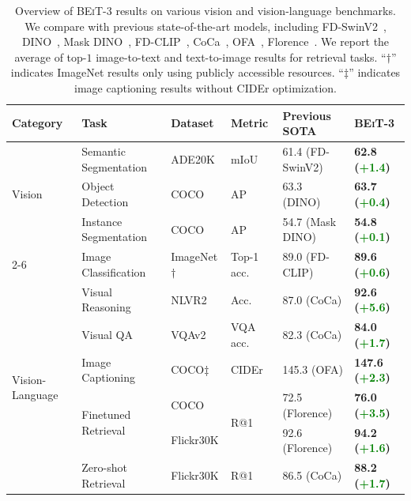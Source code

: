 \documentclass{article}
\newcommand\our{\textsc{BEiT-3}}
\begin{document}
\begin{table}
\centering
\small
\begin{tabular}{@{}llllll@{}}
\toprule
\bf Category & \bf Task & \bf Dataset & \bf Metric & \bf Previous SOTA & \bf \our{} \\
\midrule
\multirow{3}{*}{Vision} & Semantic Segmentation & ADE20K & mIoU & 61.4 (FD-SwinV2) & \bf 62.8 (\textcolor{Green}{+1.4}) \\
\cmidrule{2-6}
& Object Detection & COCO & AP & 63.3 (DINO) & \bf 63.7
(\textcolor{Green}{+0.4}) \\
& Instance Segmentation & COCO & AP & 54.7 (Mask DINO) & \bf 54.8
(\textcolor{Green}{+0.1}) \\
\cmidrule{2-6}
& Image Classification & ImageNet$\dag$ & Top-1 acc. & 89.0 (FD-CLIP) & \bf 89.6 (\textcolor{Green}{+0.6}) \\
\midrule
\multirow{6}{*}{Vision-Language} & Visual Reasoning & NLVR2 & Acc. & 87.0 (CoCa) & \bf 92.6 (\textcolor{Green}{+5.6}) \\
\cmidrule{2-6}
& Visual QA & VQAv2 & VQA acc. & 82.3 (CoCa) & \bf 84.0 (\textcolor{Green}{+1.7}) \\
\cmidrule{2-6}
& Image Captioning & COCO$\ddag$ & CIDEr & 145.3 (OFA) & \bf 147.6 (\textcolor{Green}{+2.3}) \\
\cmidrule{2-6}
& \multirow{2}{*}{Finetuned Retrieval} & COCO & \multirow{2}{*}{R@1} & 72.5 (Florence) & \bf 76.0 (\textcolor{Green}{+3.5}) \\
& & Flickr30K & & 92.6 (Florence) & \bf 94.2 (\textcolor{Green}{+1.6}) \\
\cmidrule{2-6}
& Zero-shot Retrieval & Flickr30K & R@1 & 86.5 (CoCa) & \bf 88.2 (\textcolor{Green}{+1.7}) \\
\bottomrule
\end{tabular}
\caption{Overview of \our{} results on various vision and vision-language benchmarks. 
We compare with previous state-of-the-art models, including FD-SwinV2~\citep{fd-swin}, DINO~\citep{dino-od}, Mask DINO~\citep{dino-od}, FD-CLIP~\citep{fd-swin}, CoCa~\citep{coca}, OFA~\citep{ofa}, Florence~\citep{florence}.
We report the average of top-$1$ image-to-text and text-to-image results for retrieval tasks.
``$\dag$'' indicates ImageNet results only using publicly accessible resources.
``$\ddag$'' indicates image captioning results without CIDEr optimization.
}
\label{tab:presota_comparision}
\end{table}

\end{document}
